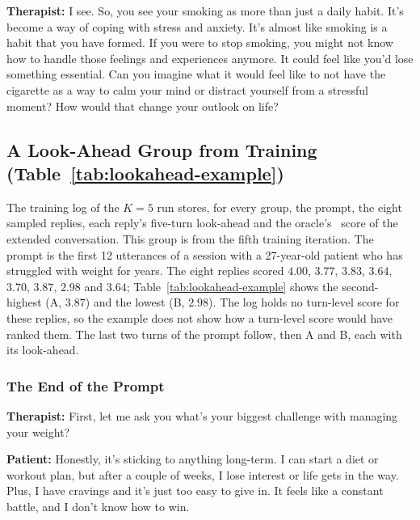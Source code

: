 \noindent\textbf{Therapist:} I see. So, you see your smoking as more than just a daily habit. It's
become a way of coping with stress and anxiety. It's almost like smoking is a habit that you have
formed. If you were to stop smoking, you might not know how to handle those feelings and experiences
anymore. It could feel like you'd lose something essential. Can you imagine what it would feel like
to not have the cigarette as a way to calm your mind or distract yourself from a stressful moment?
How would that change your outlook on life?

\normalsize

\subsection{A Look-Ahead Group from Training (Table~\ref{tab:lookahead-example})}
\label{app:example-lookahead}

The training log of the $K{=}5$ run stores, for every group, the prompt, the eight sampled replies,
each reply's five-turn look-ahead and the oracle's \QQ\ score of the extended conversation. This
group is from the fifth training iteration. The prompt is the first 12 utterances of a session with
a 27-year-old patient who has struggled with weight for years. The eight replies scored $4.00$,
$3.77$, $3.83$, $3.64$, $3.70$, $3.87$, $2.98$ and $3.64$; Table~\ref{tab:lookahead-example} shows
the second-highest (A, $3.87$) and the lowest (B, $2.98$). The log holds no turn-level score for
these replies, so the example does not show how a turn-level score would have ranked them. The last
two turns of the prompt follow, then A and B, each with its look-ahead.

\small

\subsubsection*{The End of the Prompt}

\noindent\textbf{Therapist:} First, let me ask you what's your biggest challenge with managing your weight?

\noindent\textbf{Patient:} Honestly, it's sticking to anything long-term. I can start a diet or workout plan, but after a couple of weeks, I lose interest or life gets in the way. Plus, I have cravings and it's just too easy to give in. It feels like a constant battle, and I don't know how to win.

